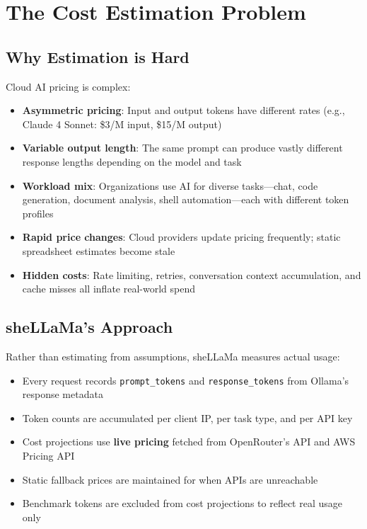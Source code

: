 \documentclass[11pt,a4paper]{article}
\begin{document}
\section{The Cost Estimation Problem}

\subsection{Why Estimation is Hard}

Cloud AI pricing is complex:

\begin{itemize}
  \item \textbf{Asymmetric pricing}: Input and output tokens have different rates (e.g., Claude 4 Sonnet: \$3/M input, \$15/M output)
  \item \textbf{Variable output length}: The same prompt can produce vastly different response lengths depending on the model and task
  \item \textbf{Workload mix}: Organizations use AI for diverse tasks---chat, code generation, document analysis, shell automation---each with different token profiles
  \item \textbf{Rapid price changes}: Cloud providers update pricing frequently; static spreadsheet estimates become stale
  \item \textbf{Hidden costs}: Rate limiting, retries, conversation context accumulation, and cache misses all inflate real-world spend
\end{itemize}

\subsection{sheLLaMa's Approach}

Rather than estimating from assumptions, sheLLaMa measures actual usage:

\begin{itemize}
  \item Every request records \texttt{prompt\_tokens} and \texttt{response\_tokens} from Ollama's response metadata
  \item Token counts are accumulated per client IP, per task type, and per API key
  \item Cost projections use \textbf{live pricing} fetched from OpenRouter's API and AWS Pricing API
  \item Static fallback prices are maintained for when APIs are unreachable
  \item Benchmark tokens are excluded from cost projections to reflect real usage only
\end{itemize}
\end{document}
